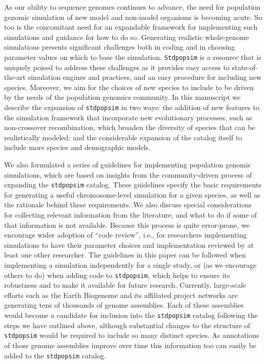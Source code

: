 \documentclass[hidelinks]{article}
\newcommand{\Stdpopsim}{\texttt{Stdpopsim}\xspace}
\newcommand{\stdpopsim}{\texttt{stdpopsim}\xspace}
\begin{document}
As our ability to sequence genomes continues to advance, the need for
population genomic simulation of new model and non-model organisms is becoming acute.
So too is the concomitant need for an expandable framework for implementing such simulations and guidance for how to do so.
Generating realistic whole-genome simulations presents significant challenges
both in coding and in choosing parameter values on which to base the simulation.
\Stdpopsim is a resource that is uniquely poised to address these 
challenges as it provides easy access to state-of-the-art simulation engines and practices, and an easy procedure for including new species.
Moreover, we aim for the choices of new species to include to be driven by the
needs of the population genomics community.
In this manuscript we 
describe the expansion of \stdpopsim in two ways:
the addition of new features to the simulation framework that incorporate new evolutionary processes,
such as non-crossover recombination, which broaden the diversity of species that can
be realistically modeled; and the considerable expansion of the catalog itself
to include more species and demographic models. 

We also formulated a series of guidelines for implementing
population genomic simulations, which are based on
insights from the community-driven process of expanding the \stdpopsim catalog.
These guidelines specify the basic requirements for generating a useful chromosome-level simulation for a given species, as well as the rationale behind these requirements.
We also discuss special considerations for collecting relevant information from the literature,
and what to do if some of that information is not available.
Because this process is quite error-prone,
we encourage wider adoption of ``code review'',
i.e., for researchers implementing simulations to have their
parameter choices and implementation reviewed by at least one other researcher.
The guidelines in this paper can be followed when implementing a simulation independently for a single study,
or (as we encourage others to do) when adding code to \stdpopsim,
which helps to ensure its robustness and to make it available for future research.
Currently, large-scale efforts such as the Earth Biogenome
and its affiliated project networks are generating tens of thousands of genome
assemblies. Each of these assemblies
would become a candidate for inclusion into the
\stdpopsim catalog following the steps we have outlined above,
although substantial changes to the structure of \stdpopsim would be required
to include so many distinct species.
As annotations of those genome assemblies improve over time this information too can easily be added to the \stdpopsim catalog.
\end{document}
